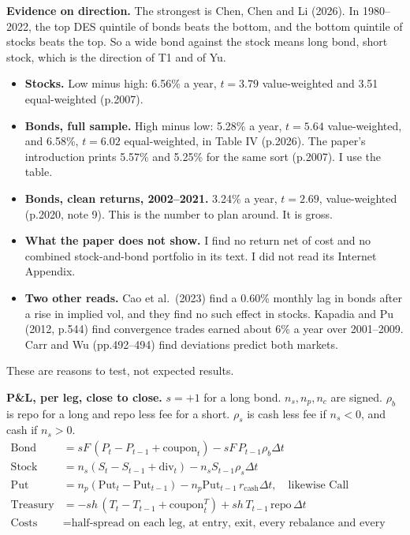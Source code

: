\documentclass[10pt,a4paper]{article}
\begin{document}
\textbf{Evidence on direction.} The strongest is Chen, Chen and Li (2026). In 1980--2022, the top DES quintile of bonds beats the bottom, and the bottom quintile of stocks beats the top. So a wide bond against the stock means long bond, short stock, which is the direction of T1 and of Yu.
\begin{itemize}[nosep]
\item \textbf{Stocks.} Low minus high: 6.56\% a year, $t=3.79$ value-weighted and 3.51 equal-weighted (p.2007).
\item \textbf{Bonds, full sample.} High minus low: 5.28\% a year, $t=5.64$ value-weighted, and 6.58\%, $t=6.02$ equal-weighted, in Table IV (p.2026). The paper's introduction prints 5.57\% and 5.25\% for the same sort (p.2007). I use the table.
\item \textbf{Bonds, clean returns, 2002--2021.} 3.24\% a year, $t=2.69$, value-weighted (p.2020, note 9). This is the number to plan around. It is gross.
\item \textbf{What the paper does not show.} I find no return net of cost and no combined stock-and-bond portfolio in its text. I did not read its Internet Appendix.
\item \textbf{Two other reads.} Cao et al.\ (2023) find a 0.60\% monthly lag in bonds after a rise in implied vol, and they find no such effect in stocks. Kapadia and Pu (2012, p.544) find convergence trades earned about 6\% a year over 2001--2009. Carr and Wu (pp.492--494) find deviations predict both markets.
\end{itemize}
These are reasons to test, not expected results.

\textbf{P\&L, per leg, close to close.} $s=+1$ for a long bond. $n_s,n_p,n_c$ are signed. $\rho_b$ is repo for a long and repo less fee for a short. $\rho_s$ is cash less fee if $n_s<0$, and cash if $n_s>0$.
\begin{align*}
\text{Bond} &= sF\,(P_t-P_{t-1}+\text{coupon}_t) - sF\,P_{t-1}\rho_b\Delta t\\
\text{Stock} &= n_s(S_t-S_{t-1}+\text{div}_t) - n_sS_{t-1}\rho_s\Delta t\\
\text{Put} &= n_p(\text{Put}_t-\text{Put}_{t-1}) - n_p\text{Put}_{t-1}\,r_{\text{cash}}\Delta t,\quad\text{likewise Call}\\
\text{Treasury} &= -sh\,(T_t-T_{t-1}+\text{coupon}^T_t) + sh\,T_{t-1}\,\text{repo}\,\Delta t\\
\text{Costs} &= \text{half-spread on each leg, at entry, exit, every rebalance and every option roll}
\end{align*}
\end{document}
